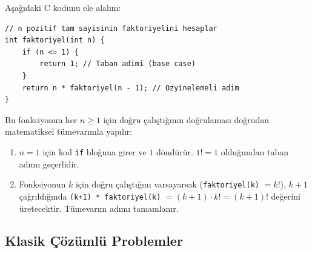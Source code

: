 Aşağıdaki C kodunu ele alalım:

\begin{lstlisting}[language=CTemel]
// n pozitif tam sayisinin faktoriyelini hesaplar
int faktoriyel(int n) {
    if (n <= 1) {
        return 1; // Taban adimi (base case)
    }
    return n * faktoriyel(n - 1); // Ozyinelemeli adim
}
\end{lstlisting}

Bu fonksiyonun her $n \ge 1$ için doğru çalıştığının doğrulaması doğrudan matematiksel tümevarımla yapılır:
\begin{enumerate}
  \item $n=1$ için kod \texttt{if} bloğuna girer ve $1$ döndürür. $1! = 1$ olduğundan taban adımı geçerlidir.
  \item Fonksiyonun $k$ için doğru çalıştığını varsayarsak (\texttt{faktoriyel(k)} $= k!$), $k+1$ çağrıldığında \texttt{(k+1) * faktoriyel(k)} $= (k+1) \cdot k! = (k+1)!$ değerini üretecektir. Tümevarım adımı tamamlanır.
\end{enumerate}

\subsection{Klasik Çözümlü Problemler}

